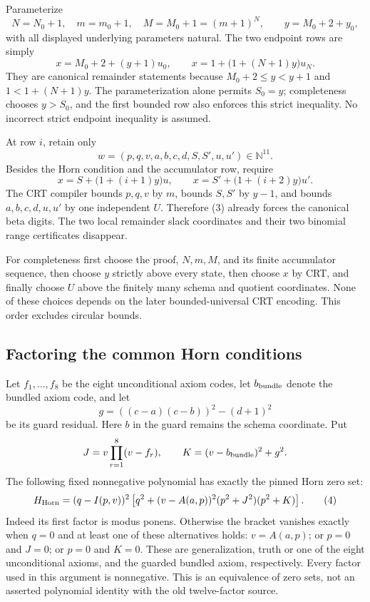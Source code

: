 \documentclass[11pt]{article}
\begin{document}
Parameterize
\[
 N=N_0+1,\quad m=m_0+1,\quad M=M_0+1=(m+1)^N,
 \qquad y=M_0+2+y_0,
\]
with all displayed underlying parameters natural.  The two endpoint rows
are simply
\[
 x=M_0+2+(y+1)u_0,
 \qquad x=1+\bigl(1+(N+1)y\bigr)u_N. \tag{2}
\]
They are canonical remainder statements because $M_0+2\le y<y+1$ and
$1<1+(N+1)y$.  The parameterization alone permits $S_0=y$; completeness
chooses $y>S_0$, and the first bounded row also enforces this strict
inequality.  No incorrect strict endpoint inequality is assumed.

At row $i$, retain only
\[
 w=(p,q,v,a,b,c,d,S,S',u,u')\in\mathbb N^{11}.
\]
Besides the Horn condition and the accumulator row, require
\[
 x=S+\bigl(1+(i+1)y\bigr)u,
 \qquad x=S'+\bigl(1+(i+2)y\bigr)u'. \tag{3}
\]
The CRT compiler bounds $p,q,v$ by $m$, bounds $S,S'$ by $y-1$, and
bounds $a,b,c,d,u,u'$ by one independent $U$.  Therefore (3) already
forces the canonical beta digits.  The two local remainder slack
coordinates and their two binomial range certificates disappear.

For completeness first choose the proof, $N,m,M$, and its finite
accumulator sequence, then choose $y$ strictly above every state, then
choose $x$ by CRT, and finally choose $U$ above the finitely many schema
and quotient coordinates.  None of these choices depends on the later
bounded-universal CRT encoding.  This order excludes circular bounds.

\subsection{Factoring the common Horn conditions}

Let $f_1,\ldots,f_8$ be the eight unconditional axiom codes, let $b_{\rm bundle}$ denote
the bundled axiom code, and let
\[
 g=((c-a)(c-b))^2-(d+1)^2
\]
be its guard residual.  Here $b$ in the guard remains the schema coordinate.
Put
\[
 J=v\prod_{r=1}^{8}(v-f_r),\qquad
 K=(v-b_{\rm bundle})^2+g^2.
\]
The following fixed nonnegative polynomial has exactly the pinned Horn
zero set:
\[
 H_{\rm Horn}=(q-I(p,v))^2
 \left[q^2+(v-A(a,p))^2(p^2+J^2)(p^2+K)\right]. \tag{4}
\]
Indeed its first factor is modus ponens.  Otherwise the bracket vanishes
exactly when $q=0$ and at least one of these alternatives holds:
$v=A(a,p)$; or $p=0$ and $J=0$; or $p=0$ and $K=0$.
These are generalization, truth or one of the eight unconditional axioms,
and the guarded bundled axiom, respectively.  Every factor used in this
argument is nonnegative.  This is an equivalence of zero sets, not an
asserted polynomial identity with the old twelve-factor source.
\end{document}
